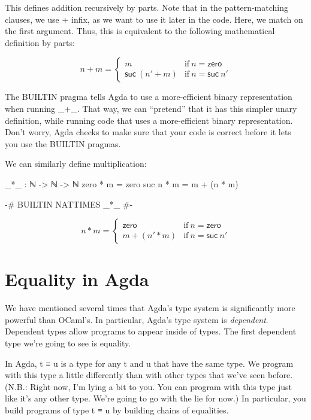 \documentclass{lecturenotes}
\begin{document}
This defines addition recursively by parts.
Note that in the pattern-matching clauses, we use + infix, as we want to use it later in the code.
Here, we match on the first argument.
Thus, this is equivalent to the following mathematical definition by parts:

$$
n + m = \left\{\begin{array}{ll}
  m & \text{if}~ n = \textsf{zero}\\
  \textsf{suc}~(n' + m) & \text{if}~n=\textsf{suc}~n'
\end{array}
\right.
$$

The \textsf{BUILTIN} pragma tells Agda to use a more-efficient binary representation when running \textsf{\_+\_}.
That way, we can ``pretend'' that it has this simpler unary definition, while running code that uses a more-efficient binary representation.
Don't worry, Agda checks to make sure that your code is correct before it lets you use the \textsf{BUILTIN} pragmas.

We can similarly define multiplication:\\
\begin{minipage}{0.5\linewidth}
\begin{code}
  _*_ : ℕ -> ℕ -> ℕ
  zero * m = zero
  suc n * m = m + (n * m)

  {-# BUILTIN NATTIMES _*_ #-}
\end{code}
\end{minipage}
\begin{minipage}{0.5\linewidth}
  $$
  n * m = \left\{\begin{array}{ll}
    \textsf{zero} & \text{if}~n=\textsf{zero}\\
    m + (n' * m) & \text{if}~n=\textsf{suc}~n'
  \end{array}\right.
$$
\end{minipage}

\section{Equality in Agda}
\label{sec:equality-agda}

We have mentioned several times that Agda's type system is significantly more powerful than OCaml's.
In particular, Agda's type system is \emph{dependent}.
Dependent types allow programs to appear inside of types.
The first dependent type we're going to see is equality.

In Agda, \textsf{t ≡ u} is a type for any \textsf{t} and \textsf{u} that have the same type.
We program with this type a little differently than with other types that we've seen before.
(N.B.: Right now, I'm lying a bit to you.
You can program with this type just like it's any other type.
We're going to go with the lie for now.)
In particular, you build programs of type \textsf{t ≡ u} by building chains of equalities.
\end{document}
